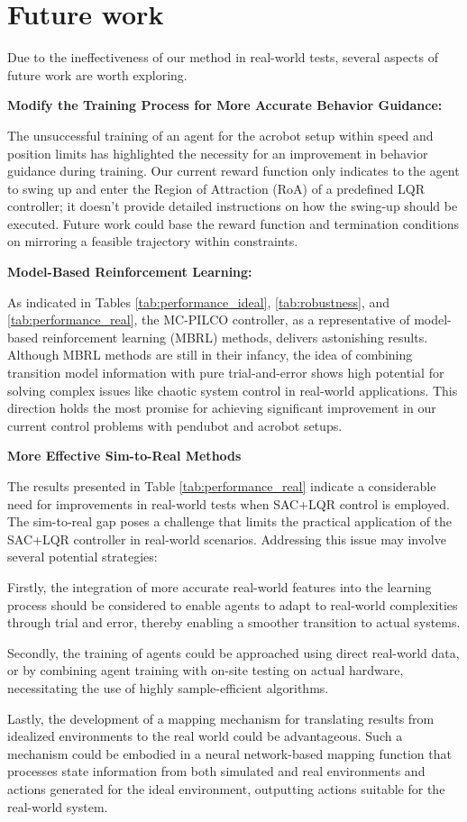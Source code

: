 \chapter{Future work}
Due to the ineffectiveness of our method in real-world tests, several aspects of future work are worth exploring.

\textbf{Modify the Training Process for More Accurate Behavior Guidance:}

The unsuccessful training of an agent for the acrobot setup within speed and position limits has highlighted the necessity for an improvement in behavior guidance during training. Our current reward function only indicates to the agent to swing up and enter the Region of Attraction (RoA) of a predefined LQR controller; it doesn't provide detailed instructions on how the swing-up should be executed. Future work could base the reward function and termination conditions on mirroring a feasible trajectory within constraints.

\textbf{Model-Based Reinforcement Learning:}

As indicated in Tables \ref{tab:performance_ideal}, \ref{tab:robustness}, and \ref{tab:performance_real}, the MC-PILCO controller, as a representative of model-based reinforcement learning (MBRL) methods, delivers astonishing results. Although MBRL methods are still in their infancy, the idea of combining transition model information with pure trial-and-error shows high potential for solving complex issues like chaotic system control in real-world applications. This direction holds the most promise for achieving significant improvement in our current control problems with pendubot and acrobot setups.

\textbf{More Effective Sim-to-Real Methods}

The results presented in Table \ref{tab:performance_real} indicate a considerable need for improvements in real-world tests when SAC+LQR control is employed. The sim-to-real gap poses a challenge that limits the practical application of the SAC+LQR controller in real-world scenarios. Addressing this issue may involve several potential strategies: 

Firstly, the integration of more accurate real-world features into the learning process should be considered to enable agents to adapt to real-world complexities through trial and error, thereby enabling a smoother transition to actual systems. 

Secondly, the training of agents could be approached using direct real-world data, or by combining agent training with on-site testing on actual hardware, necessitating the use of highly sample-efficient algorithms. 

Lastly, the development of a mapping mechanism for translating results from idealized environments to the real world could be advantageous. Such a mechanism could be embodied in a neural network-based mapping function that processes state information from both simulated and real environments and actions generated for the ideal environment, outputting actions suitable for the real-world system.

\cleardoublepage
